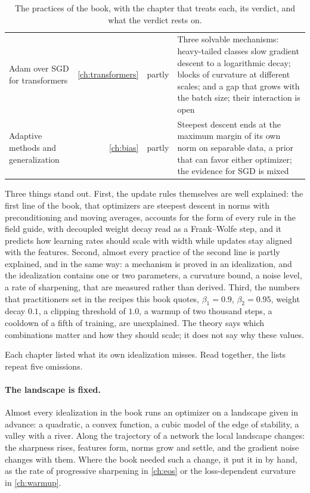 \begin{refsection}
\begin{table}[p]
\begin{fullwidth}
\begin{tabular}{@{}>{\raggedright\arraybackslash}p{31mm}r>{\raggedright\arraybackslash}p{17mm}>{\raggedright\arraybackslash}p{104mm}@{}}
Adam over SGD for transformers & \ref{ch:transformers} & partly & Three solvable mechanisms: heavy-tailed classes slow gradient descent to a logarithmic decay; blocks of curvature at different scales; and a gap that grows with the batch size; their interaction is open\\
Adaptive methods and generalization & \ref{ch:bias} & partly & Steepest descent ends at the maximum margin of its own norm on separable data, a prior that can favor either optimizer; the evidence for SGD is mixed\\
\bottomrule
\end{tabular}
\caption{The practices of the book, with the chapter that treats each, its verdict, and what the verdict rests on.}
\label{tab:epilogue:ledger}
\end{fullwidth}
\end{table}

Three things stand out. First, the update rules themselves are well explained: the first line of the book, that optimizers are steepest descent in norms with preconditioning and moving averages, accounts for the form of every rule in the field guide, with decoupled weight decay read as a Frank--Wolfe step, and it predicts how learning rates should scale with width while updates stay aligned with the features. Second, almost every practice of the second line is partly explained, and in the same way: a mechanism is proved in an idealization, and the idealization contains one or two parameters, a curvature bound, a noise level, a rate of sharpening, that are measured rather than derived. Third, the numbers that practitioners set in the recipes this book quotes, $\beta_1=0.9$, $\beta_2=0.95$, weight decay $0.1$, a clipping threshold of $1.0$, a warmup of two thousand steps, a cooldown of a fifth of training, are unexplained. The theory says which combinations matter and how they should scale; it does not say why these values.


Each chapter listed what its own idealization misses. Read together, the lists repeat five omissions.

\paragraph{The landscape is fixed.} Almost every idealization in the book runs an optimizer on a landscape given in advance: a quadratic, a convex function, a cubic model of the edge of stability, a valley with a river. Along the trajectory of a network the local landscape changes: the sharpness rises, features form, norms grow and settle, and the gradient noise changes with them. Where the book needed such a change, it put it in by hand, as the rate of progressive sharpening in \cref{ch:eos} or the loss-dependent curvature in \cref{ch:warmup}.


\end{refsection}
